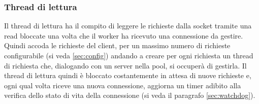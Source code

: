 \documentclass[italian]{tktltiki2}
\begin{document}
\subsubsection{Thread di lettura}
\label{sec:reader}
Il thread di lettura ha il compito di leggere le richieste dalla socket tramite una read bloccate una volta che il worker ha ricevuto una connessione da gestire. Quindi accoda le richieste del client, per un massimo numero di richieste configurabile (si veda \ref{sec:config}) andando a creare per ogni richiesta un thread di richiesta che, dialogando con un server nella pool, si occuperà di gestirla. Il thread di lettura quindi è bloccato costantemente in attesa di nuove richieste e, ogni qual volta riceve una nuova connessione, aggiorna un timer adibito alla verifica dello stato di vita della connessione (si veda il paragrafo \ref{sec:watchdog}).
\end{document}
